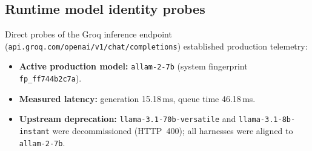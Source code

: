 \documentclass[11pt,a4paper]{article}
\begin{document}
\subsection{Runtime model identity probes}
Direct probes of the Groq inference endpoint (\texttt{api.groq.com/openai/v1/chat/completions}) established production telemetry:
\begin{itemize}[leftmargin=*,itemsep=1pt]
  \item \textbf{Active production model:} \texttt{allam-2-7b} (system fingerprint \texttt{fp\_ff744b2c7a}).
  \item \textbf{Measured latency:} generation 15.18\,ms, queue time 46.18\,ms.
  \item \textbf{Upstream deprecation:} \texttt{llama-3.1-70b-versatile} and \texttt{llama-3.1-8b-instant} were decommissioned (HTTP~400); all harnesses were aligned to \texttt{allam-2-7b}.
\end{itemize}
\end{document}
